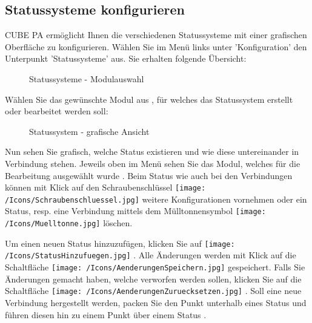 \subsection{Statussysteme konfigurieren}

CUBE PA ermöglicht Ihnen die verschiedenen Statussysteme mit einer grafischen Oberfläche zu konfigurieren. Wählen Sie im Menü links unter 'Konfiguration' den Unterpunkt 'Statussysteme' aus. Sie erhalten folgende Übersicht:

\begin{figure}[H]
\caption{Statussysteme - Modulauswahl}
\end{figure}

Wählen Sie das gewünschte Modul aus , für welches das Statussystem erstellt oder bearbeitet werden soll:

\begin{figure}[H]
\caption{Statussystem - grafische Ansicht}
\end{figure}

Nun sehen Sie grafisch, welche Status existieren und wie diese untereinander in Verbindung stehen. Jeweils oben im Menü sehen Sie das Modul, welches für die Bearbeitung ausgewählt wurde .
Beim Status wie auch bei den Verbindungen können mit Klick auf den Schraubenschlüssel \texttt{[image: /Icons/Schraubenschluessel.jpg]}  weitere Konfigurationen vornehmen oder ein Status, resp. eine Verbindung mittels dem Mülltonnensymbol \texttt{[image: /Icons/Muelltonne.jpg]}  löschen.

\vspace{\baselineskip}

Um einen neuen Status hinzuzufügen, klicken Sie auf \texttt{[image: /Icons/StatusHinzufuegen.jpg]} . Alle Änderungen werden mit Klick auf die Schaltfläche \texttt{[image: /Icons/AenderungenSpeichern.jpg]}  gespeichert. Falls Sie Änderungen gemacht haben, welche verworfen werden sollen, klicken Sie auf die Schaltfläche \texttt{[image: /Icons/AenderungenZuruecksetzen.jpg]} . Soll eine neue Verbindung hergestellt werden, packen Sie den Punkt unterhalb eines Status  und führen diesen hin zu einem Punkt über einem Status .

